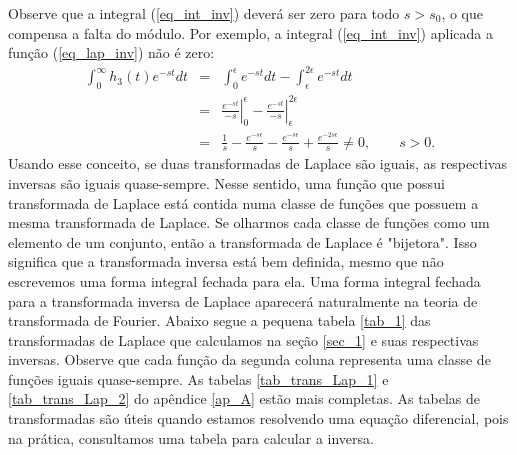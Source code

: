 Observe que a integral (\ref{eq_int_inv}) deverá ser zero para todo $s>s_0$, o que compensa a falta do módulo. Por exemplo, a integral (\ref{eq_int_inv}) aplicada a função (\ref{eq_lap_inv}) não é zero:
\begin{eqnarray*}
\int_0^\infty h_3(t)e^{-st}dt&=&\int_0^\epsilon e^{-st}dt-\int_\epsilon^{2\epsilon} e^{-st}dt\\
&=&\left.\frac{ e^{-st}}{-s}\right|_0^\epsilon-\left.\frac{e^{-st}}{-s}\right|_{\epsilon}^{2\epsilon}\\
&=&\frac{1}{s}-\frac{ e^{-s\epsilon}}{s}-\frac{e^{-s\epsilon}}{s}+\frac{e^{-2s\epsilon}}{s}\neq 0,\qquad s>0.
\end{eqnarray*}
Usando esse conceito, se duas transformadas de Laplace são iguais, as respectivas inversas são iguais quase-sempre. Nesse sentido, uma função que possui transformada de Laplace está contida numa classe de funções que possuem a mesma transformada de Laplace. Se olharmos cada classe de funções como um elemento de um conjunto, então a transformada de Laplace é "bijetora". Isso significa que a transformada inversa está bem definida, mesmo que não escrevemos uma forma integral fechada para ela. Uma forma integral fechada para a transformada inversa de Laplace aparecerá naturalmente na teoria de transformada de Fourier.
Abaixo segue a pequena tabela \ref{tab_1} das transformadas de Laplace que calculamos na seção \ref{sec_1} e suas respectivas inversas. Observe que cada função da segunda coluna representa uma classe de funções iguais quase-sempre. As tabelas \ref{tab_trans_Lap_1} e \ref{tab_trans_Lap_2} do apêndice \ref{ap_A} estão mais completas. As tabelas de transformadas são úteis quando estamos resolvendo uma equação diferencial, pois na prática, consultamos uma tabela para calcular a inversa.
